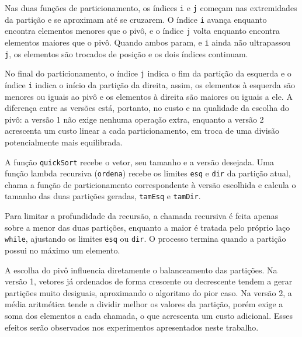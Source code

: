 \quad Nas duas funções de particionamento, os índices \texttt{i} e
\texttt{j} começam nas extremidades da partição e se aproximam até se
cruzarem. O índice \texttt{i} avança enquanto encontra elementos menores
que o pivô, e o índice \texttt{j} volta enquanto encontra elementos
maiores que o pivô. Quando ambos param, e \texttt{i} ainda não
ultrapassou \texttt{j}, os elementos são trocados de posição e os dois
índices continuam.

\quad No final do particionamento, o índice \texttt{j} indica o fim da
partição da esquerda e o índice \texttt{i} indica o início da partição da
direita, assim, os elementos à esquerda são menores ou iguais
ao pivô e os elementos à direita são maiores ou iguais a ele. A
diferença entre as versões está, portanto, no custo e na qualidade da
escolha do pivô: a versão 1 não exige nenhuma operação extra, enquanto a
versão 2 acrescenta um custo linear a cada particionamento, em troca de
uma divisão potencialmente mais equilibrada.

\quad A função \texttt{quickSort} recebe o vetor, seu tamanho e a versão
desejada. Uma função lambda recursiva (\texttt{ordena})
recebe os limites \texttt{esq} e \texttt{dir} da partição atual, chama a
função de particionamento correspondente à versão escolhida e calcula o
tamanho das duas partições geradas, \texttt{tamEsq} e \texttt{tamDir}.

\quad Para limitar a profundidade da recursão, a chamada recursiva é feita
apenas sobre a menor das duas partições, enquanto a maior é tratada pelo
próprio laço \texttt{while}, ajustando os limites \texttt{esq} ou
\texttt{dir}. O processo termina quando a partição possui no máximo um
elemento.

\quad A escolha do pivô influencia diretamente o balanceamento das
partições. Na versão 1, vetores já ordenados de forma crescente ou
decrescente tendem a gerar partições muito desiguais, aproximando o
algoritmo do pior caso. Na versão 2, a média aritmética tende a dividir
melhor os valores da partição, porém exige a soma dos elementos a cada
chamada, o que acrescenta um custo adicional. Esses efeitos serão
observados nos experimentos apresentados neste trabalho.
